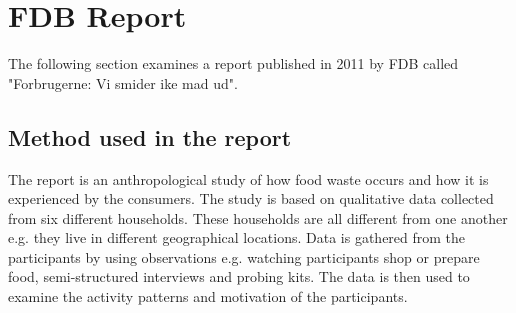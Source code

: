 \section{FDB Report}
The following section examines a report published in 2011 by FDB called "Forbrugerne: Vi smider ike mad ud"\cite{madSpild_FDB}.
\subsection{Method used in the report}
The report is an anthropological study of how food waste occurs and how it is experienced by the consumers. The study is based on qualitative data collected from six different households. These households are all different from one another e.g. they live in different geographical locations. Data is gathered from the participants by using observations e.g. watching participants shop or prepare food, semi-structured interviews and probing kits. The data is then used to examine the activity patterns and motivation of the participants.

